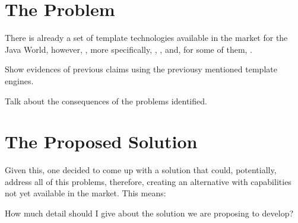 \section{The Problem}

There is already a set of template technologies available in the market for the Java World, however, , more specifically, , ,  and, for some of them, . 

\begin{expand}
    Show evidences of previous claims using the previousy mentioned template engines.
\end{expand}

\begin{expand}
    Talk about the consequences of the problems identified.
\end{expand}

\section{The Proposed Solution}

Given this, one decided to come up with a solution that could, potentially, address all of this problems, therefore, creating an alternative with capabilities not yet available in the market. This means:


\begin{orientador}
    How much detail should I give about the solution we are proposing to develop?
\end{orientador}